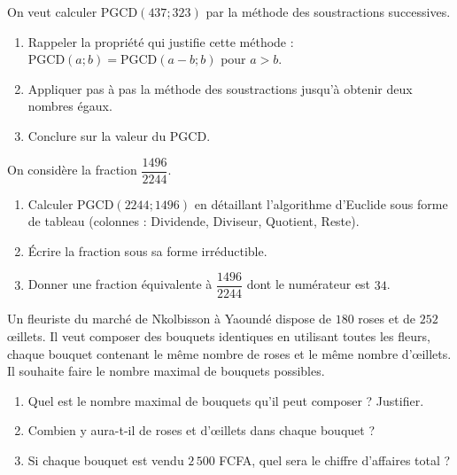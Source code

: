 \documentclass[11pt]{article}
\newcounter{popsec}
\newcounter{popsub}
\newcommand{\courssub}[1]{%
  \stepcounter{popsub}%
  \par\vspace{9pt}\noindent{\popxbold\fontsize{11.5}{13}\selectfont\color{popink}{\color{poporange}\thepopsec.\thepopsub}\hspace{6pt}#1}\par\nopagebreak\vspace{4pt}
}
\begin{document}
\courssub{Je m'entraîne}

\begin{exercice}
On veut calculer $\text{PGCD}(437 ; 323)$ par la méthode des soustractions successives.
\begin{enumerate}
    \item Rappeler la propriété qui justifie cette méthode : $\text{PGCD}(a ; b) = \text{PGCD}(a-b ; b)$ pour $a > b$.
    \item Appliquer pas à pas la méthode des soustractions jusqu'à obtenir deux nombres égaux.
    \item Conclure sur la valeur du PGCD.
\end{enumerate}
\end{exercice}

\begin{exercice}
On considère la fraction $\dfrac{1496}{2244}$.
\begin{enumerate}
    \item Calculer $\text{PGCD}(2244 ; 1496)$ en détaillant l'algorithme d'Euclide sous forme de tableau (colonnes : Dividende, Diviseur, Quotient, Reste).
    \item Écrire la fraction sous sa forme irréductible.
    \item Donner une fraction équivalente à $\dfrac{1496}{2244}$ dont le numérateur est $34$.
\end{enumerate}
\end{exercice}

\begin{exercice}
Un fleuriste du marché de Nkolbisson à Yaoundé dispose de $180$ roses et de $252$ œillets. Il veut composer des bouquets identiques en utilisant toutes les fleurs, chaque bouquet contenant le même nombre de roses et le même nombre d'œillets. Il souhaite faire le nombre maximal de bouquets possibles.
\begin{enumerate}
    \item Quel est le nombre maximal de bouquets qu'il peut composer ? Justifier.
    \item Combien y aura-t-il de roses et d'œillets dans chaque bouquet ?
    \item Si chaque bouquet est vendu $2\,500$ FCFA, quel sera le chiffre d'affaires total ?
\end{enumerate}
\end{exercice}
\end{document}
